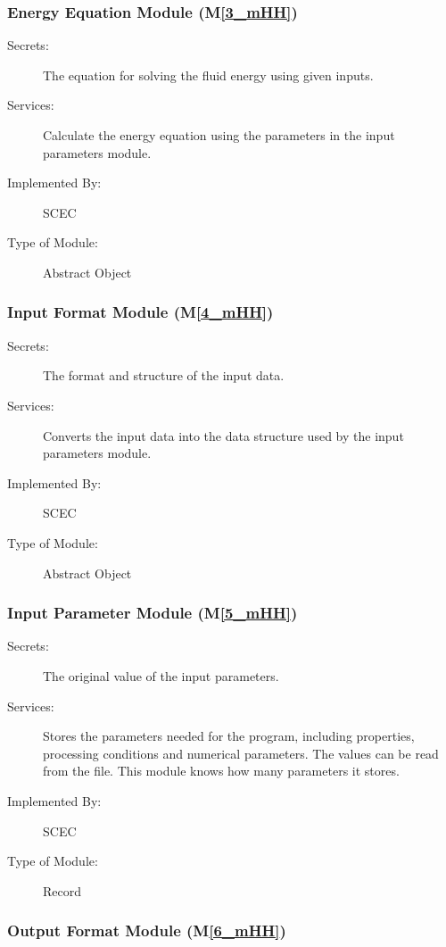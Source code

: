 \documentclass[12pt, titlepage]{article}
\newcommand{\mref}[1]{M\ref{#1}}
\begin{document}
\subsubsection{Energy Equation Module (\mref{3_mHH})}

\begin{description}
\item[Secrets:] The equation for solving the fluid energy using given inputs. 
\item[Services:] Calculate the energy equation using the parameters in the input parameters module.  
\item[Implemented By:] SCEC
\item[Type of Module:] Abstract Object
\end{description}


\subsubsection{Input Format Module (\mref{4_mHH})}

\begin{description}
\item[Secrets:]The format and structure of the input data.
\item[Services:]Converts the input data into the data structure used by the
  input parameters module.
\item[Implemented By:] SCEC
\item[Type of Module:] Abstract Object
\end{description}

\subsubsection{Input Parameter Module (\mref{5_mHH})}

\begin{description}
\item[Secrets:] The original value of the input parameters. 
\item[Services:] Stores the parameters needed for the program, including properties, processing conditions and numerical parameters. The values can be read from the file. This module knows how many parameters it stores. 
\item[Implemented By:] SCEC
\item[Type of Module:] Record
\end{description}

\subsubsection{Output Format Module (\mref{6_mHH})}
\end{document}
